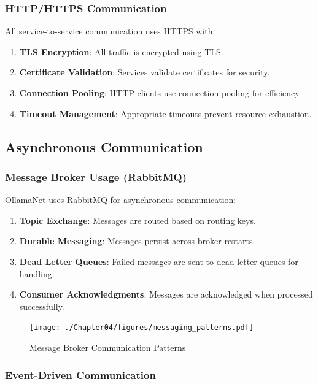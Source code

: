 \subsubsection{HTTP/HTTPS Communication}

All service-to-service communication uses HTTPS with:

\begin{enumerate}
   \item \textbf{TLS Encryption}: All traffic is encrypted using TLS.
   \item \textbf{Certificate Validation}: Services validate certificates for security.
   \item \textbf{Connection Pooling}: HTTP clients use connection pooling for efficiency.
   \item \textbf{Timeout Management}: Appropriate timeouts prevent resource exhaustion.
\end{enumerate}

\subsection{Asynchronous Communication}

\subsubsection{Message Broker Usage (RabbitMQ)}

OllamaNet uses RabbitMQ for asynchronous communication:

\begin{enumerate}
   \item \textbf{Topic Exchange}: Messages are routed based on routing keys.
   \item \textbf{Durable Messaging}: Messages persist across broker restarts.
   \item \textbf{Dead Letter Queues}: Failed messages are sent to dead letter queues for handling.
   \item \textbf{Consumer Acknowledgments}: Messages are acknowledged when processed successfully.
\end{enumerate}

\begin{figure}
    \centering
    \texttt{[image: ./Chapter04/figures/messaging\_patterns.pdf]}
    \caption{Message Broker Communication Patterns}
    \label{fig:messaging-patterns}
\end{figure}
\clearpage

\subsubsection{Event-Driven Communication}

